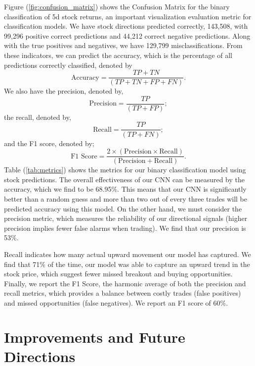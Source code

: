 \documentclass[12pt]{article}
\begin{document}
Figure (\ref{fig:confusion_matrix}) shows the Confusion Matrix for the binary classification of 5d stock returns, an important visualization evaluation metric for classification models. We have stock directions predicted correctly, 143,508, with 99,296 positive correct predictions and 44,212 correct negative predictions. Along with the true positives and negatives, we have 129,799 misclassifications. From these indicators, we can predict the accuracy, which is the percentage of all predictions correctly classified, denoted by
\begin{equation}
	\text{Accuracy}=\frac{TP+TN}{(TP+TN+FP+FN)}.
\end{equation}
We also have the precision, denoted by,
\begin{equation}
	\text{Precision}=\frac{TP}{(TP+FP)};
\end{equation}
the recall, denoted by,
\begin{equation}
	\text{Recall}=\frac{TP}{(TP+FN)};
\end{equation}
and the F1 score, denoted by;
\begin{equation}
	\text{F1 Score}=\frac{2\times (\text{Precision}\times\text{Recall})}{(\text{Precision}+\text{Recall})}.
\end{equation}
Table (\ref{tab:metrics}) shows the metrics for our binary classification model using stock predictions. The overall effectiveness of our CNN can be measured by the accuracy, which we find to be 68.95\%. This means that our CNN is significantly better than a random guess and more than two out of every three trades will be predicted accuracy using this model. On the other hand, we must consider the precision metric, which measures the reliability of our directional signals (higher precision implies fewer false alarms when trading). We find that our precision is 53\%.

Recall indicates how many actual upward movement our model has captured. We find that 71\% of the time, our model was able to capture an upward trend in the stock price, which suggest fewer missed breakout and buying opportunities. Finally, we report the F1 Score, the harmonic average of both the precision and recall metrics, which provides a balance between costly trades (false positives) and missed opportunities (false negatives). We report an F1 score of 60\%.

\section*{Improvements and Future Directions}
\end{document}
